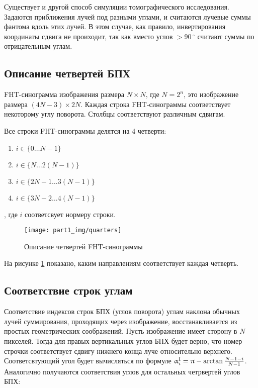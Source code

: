 Существует и другой способ симуляции томографического исследования. Задаются приближения лучей под разными углами, и считаются лучевые суммы фантома вдоль этих лучей. В этом случае, как правило, инвертирования координаты сдвига не проиходит, так как вместо углов $> 90\,^{\circ}$ считают суммы по отрицательным углам.

\subsection{Описание четвертей БПХ}
FHT-синограмма изображения размера $N \times N$, где $N = 2^n$, это изображение размера $(4N - 3) \times 2N$. Каждая строка FHT-синограммы соответствует некоторому углу поворота. Столбцы соответствуют различным сдвигам. 

Все строки FHT-синограммы делятся на 4 четверти:
\begin{enumerate}[label=\Roman*.]
\item $i \in \{0 \dots N-1\}$ \label{enum:I}
\item $i \in \{N \dots 2(N-1)\}$ \label{enum:II}
\item $i \in \{2N-1 \dots 3(N-1)\}$ \label{enum:III}
\item $i \in \{3N-2 \dots 4(N-1)\}$ \label{enum:IV}
\end{enumerate}
, где $i$ соответсвует нормеру строки.

\begin{figure}[h!]
  \centering
    \texttt{[image: part1\_img/quarters]}
  \caption{Описание четвертей FHT-синограммы}
  \label{fig:quarters}
\end{figure}

На рисунке \ref{fig:quarters} показано, каким направлениям соответствует каждая четверть.


\subsection{Соответствие строк углам}
Соответствие индексов строк БПХ (углов поворота) углам наклона обычных лучей суммирования, проходящих через изображение, восстанавливается из простых геометрических соображений.
Пусть изображение имеет сторону в $N$ пикселей.
Тогда для правых вертикальных углов БПХ будет верно, что номер строчки соответствует сдвигу нижнего конца луче относительно верхнего.
Соответсвтующий угол будет вычисляться по формуле $\alpha^{\rom{1}}_i = \pi - \arctan{\frac{N-1-i}{N-1}}$.
Аналогично получаются соответствия углов для остальных четрвертей углов БПХ:

